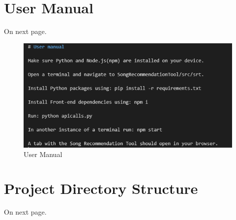 \documentclass{l4proj}
\begin{document}
\begin{appendices}
\chapter{User Manual}
On next page.
\begin{figure}
    \centering
    \includegraphics[width=1\linewidth]{appendices/image_2024-03-17_142801856.png}
    \caption{User Manual}
    \label{fig:enter-label}
\end{figure}

\chapter{Project Directory Structure}
On next page.


\end{appendices}







\end{document}
